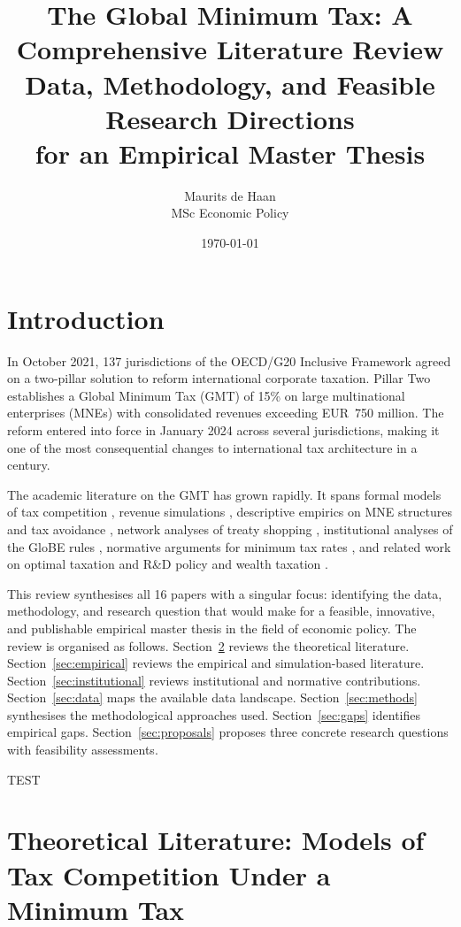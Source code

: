 \documentclass[11pt,a4paper]{article}
\title{\textbf{The Global Minimum Tax: A Comprehensive Literature Review\\[6pt]
\large Data, Methodology, and Feasible Research Directions\\for an Empirical Master Thesis}}
\author{Maurits de Haan\\[4pt]
\small MSc Economic Policy}
\date{\today}
\begin{document}
\maketitle

\tableofcontents
\newpage

\section{Introduction}
\label{sec:intro}


In October 2021, 137 jurisdictions of the OECD/G20 Inclusive Framework agreed on a two-pillar solution to reform international corporate taxation. Pillar Two establishes a Global Minimum Tax (GMT) of 15\% on large multinational enterprises (MNEs) with consolidated revenues exceeding EUR~750 million. The reform entered into force in January 2024 across several jurisdictions, making it one of the most consequential changes to international tax architecture in a century.

The academic literature on the GMT has grown rapidly. It spans formal models of tax competition \citep{Johannesen2022,hebous2023,janeba2023,schjelderup2024,hindriks2025}, revenue simulations \citep{barake2022,hugger2025}, descriptive empirics on MNE structures and tax avoidance \citep{bilicka2023,devereux2023,torslov2022}, network analyses of treaty shopping \citep{vantriet2025}, institutional analyses of the GloBE rules \citep{hanlon2023,schanz2023}, normative arguments for minimum tax rates \citep{cassee2019}, and related work on optimal taxation and R\&D policy \citep{akcigit2022} and wealth taxation \citep{boadway2026}.

This review synthesises all 16 papers with a singular focus: identifying the data, methodology, and research question that would make for a feasible, innovative, and publishable empirical master thesis in the field of economic policy. The review is organised as follows. Section~\ref{sec:theory} reviews the theoretical literature. Section~\ref{sec:empirical} reviews the empirical and simulation-based literature. Section~\ref{sec:institutional} reviews institutional and normative contributions. Section~\ref{sec:data} maps the available data landscape. Section~\ref{sec:methods} synthesises the methodological approaches used. Section~\ref{sec:gaps} identifies empirical gaps. Section~\ref{sec:proposals} proposes three concrete research questions with feasibility assessments.

TEST


\section{Theoretical Literature: Models of Tax Competition Under a Minimum Tax}
\label{sec:theory}
\end{document}
